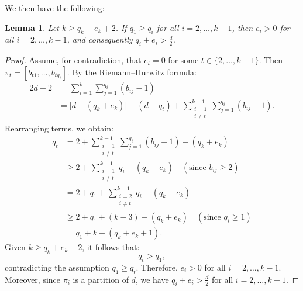 \documentclass[microtype]{gtpart}     %
\newtheorem{lem}[theorem]{Lemma}          %
\theoremstyle{definition}
\begin{document}
We then have the following:

\begin{lem}\label{le8.1}
Let \( k \geq q_k + e_k + 2 \). If \( q_1 \geq q_i \) for all \( i = 2, \dots, k-1 \), then \( e_i > 0 \) for all \( i = 2, \dots, k-1 \), and consequently \( q_i + e_i > \frac{d}{2} \).
\end{lem}

\begin{proof}
Assume, for contradiction, that \( e_t = 0 \) for some \( t \in \{2, \dots, k-1\} \). Then \( \pi_t = [b_{t1}, \dots, b_{tq_t}] \). By the Riemann--Hurwitz formula:
\[
\begin{aligned}
2d - 2 &= \sum_{i=1}^{k} \sum_{j=1}^{q_i} (b_{ij} - 1) \\
&= \big[d - (q_k + e_k)\big] + (d - q_t) + \sum_{\substack{i=1 \\ i \ne t}}^{k-1} \sum_{j=1}^{q_i} (b_{ij} - 1).
\end{aligned}
\]
Rearranging terms, we obtain:
\[
\begin{aligned}
q_t &= 2 + \sum_{\substack{i=1 \\ i \ne t}}^{k-1} \sum_{j=1}^{q_i} (b_{ij} - 1) - (q_k + e_k) \\
&\geq 2 + \sum_{\substack{i=1 \\ i \ne t}}^{k-1} q_i - (q_k + e_k) \quad (\text{since } b_{ij} \geq 2) \\
&= 2 + q_1 + \sum_{\substack{i=2 \\ i \ne t}}^{k-1} q_i - (q_k + e_k) \\
&\geq 2 + q_1 + (k - 3) - (q_k + e_k) \quad (\text{since } q_i \geq 1) \\
&= q_1 + k - (q_k + e_k + 1).
\end{aligned}
\]
Given \( k \geq q_k + e_k + 2 \), it follows that:
\[
q_t > q_1,
\]
contradicting the assumption \( q_1 \geq q_t \). Therefore, \( e_i > 0 \) for all \( i = 2, \dots, k-1 \). Moreover, since \( \pi_i \) is a partition of \( d \), we have \( q_i + e_i > \frac{d}{2} \) for all \( i = 2, \dots, k-1 \).
\end{proof}
\end{document}
